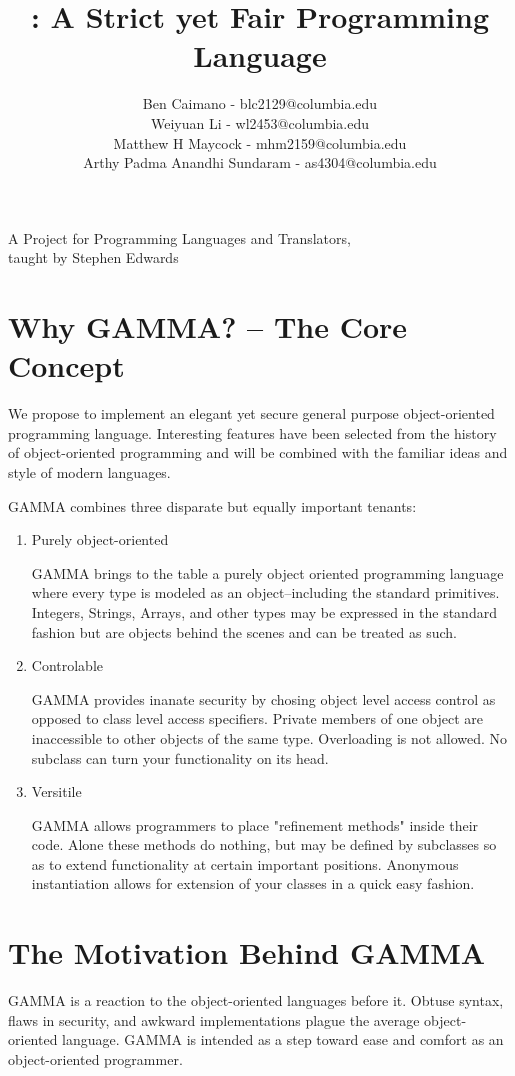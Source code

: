 \documentclass[10pt]{article}
\title{\Lang{}: A Strict yet Fair Programming Language}
\author{
	Ben Caimano - blc2129@columbia.edu \\
	Weiyuan Li - wl2453@columbia.edu \\
	Matthew H Maycock - mhm2159@columbia.edu \\
	Arthy Padma Anandhi Sundaram - as4304@columbia.edu
}
\date{}
\newcommand{\Lang}{GAMMA}
\begin{document}
\maketitle
\begin{center}
\large
A Project for Programming Languages and Translators,
\\taught by Stephen Edwards
\end{center}


\section*{Why \Lang{}? -- The Core Concept}
We propose to implement an elegant yet secure general purpose object-oriented programming language. Interesting features have been selected from the history of object-oriented programming and will be combined with the familiar ideas and style of modern languages.

\Lang{} combines three disparate but equally important tenants:


\begin{enumerate}
\item{Purely object-oriented 
    
    \Lang{} brings to the table a purely object oriented programming language where every type is
    modeled as an object--including the standard primitives. Integers, Strings, Arrays, and other types may be expressed in the standard fashion but are objects behind the scenes and can be treated as such.}

\item{Controlable

   \Lang{} provides inanate security by chosing object level access
   control as opposed to class level access specifiers. Private members of one object
   are inaccessible to other objects of the same type. Overloading is not allowed. No subclass can turn your functionality on its head.}

\item{Versitile

    \Lang{} allows programmers to place "refinement methods" inside their code. Alone these methods do nothing, but may be defined by subclasses so as to extend functionality at certain important positions. Anonymous instantiation allows for extension of your classes in a quick easy fashion.}
\end{enumerate}

\section*{ The Motivation Behind \Lang{}}
\Lang{} is a reaction to the object-oriented languages before it. Obtuse syntax, flaws in security, and awkward implementations plague the average object-oriented language. \Lang{} is intended as a step toward ease and comfort as an object-oriented programmer.
\end{document}
